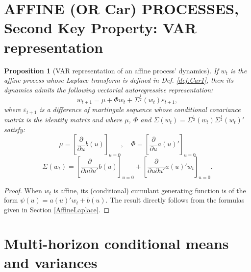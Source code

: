 \documentclass[
  12pt,
]{book}
\newtheorem{proposition}{Proposition}[chapter]
\theoremstyle{definition}
\theoremstyle{definition}
\theoremstyle{definition}
\theoremstyle{definition}
\theoremstyle{remark}
\begin{document}
\hypertarget{affine-or-car-processes-second-key-property-var-representation}{%
\section{AFFINE (OR Car) PROCESSES, Second Key Property: VAR representation}\label{affine-or-car-processes-second-key-property-var-representation}}

\begin{proposition}[VAR representation of an affine process' dynamics]
\protect\hypertarget{prp:affineVAR}{}\label{prp:affineVAR}If \(w_t\) is the affine process whose Laplace transform is defined in Def. \ref{def:Car1}, then its dynamics admits the following vectorial autoregressive representation:
\begin{equation}
    w_{t+1} = \mu + \Phi w_{t} + \Sigma^{\frac{1}{2}}(w_t) \varepsilon_{t+1},\label{eq:VARw}
    \end{equation}
where \(\varepsilon_{t+1}\) is a difference of martingale sequence whose conditional covariance matrix is the identity matrix and where \(\mu\), \(\Phi\) and \(\Sigma(w_t) = \Sigma^{\frac{1}{2}}(w_t){\Sigma^{\frac{1}{2}}(w_t)}'\) satisfy:
\begin{equation}
    \mu =  \left[\frac{\partial }{\partial u}b(u)\right]_{u=0}, \quad \Phi= \left[\frac{\partial }{\partial u}a(u)'\right]_{u=0}\label{eq:MUPHI}
    \end{equation}
\begin{equation}
    \Sigma(w_t) =  \left[\frac{\partial }{\partial u\partial u'}b(u)\right]_{u=0} + \left[\frac{\partial }{\partial u\partial u'}a(u)'w_t\right]_{u=0}.\label{eq:SigmaWt}
    \end{equation}
\end{proposition}

\begin{proof}
When \(w_t\) is affine, its (conditional) cumulant generating function is of the form \(\psi(u)=a(u)'w_t+b(u)\). The result directly follows from the formulas given in Section \ref{AffineLaplace}.
\end{proof}

\hypertarget{multi-horizon-conditional-means-and-variances}{%
\section{Multi-horizon conditional means and variances}\label{multi-horizon-conditional-means-and-variances}}
\end{document}
